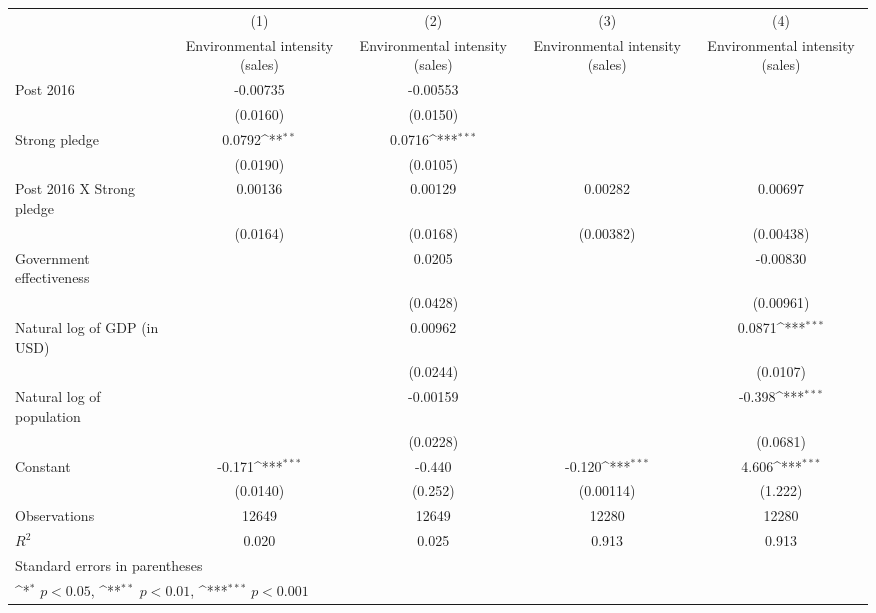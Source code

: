 {
\def\sym#1{\ifmmode^{#1}\else\(^{#1}\)\fi}
\begin{tabular}{l*{4}{c}}
\hline\hline
                    &\multicolumn{1}{c}{(1)}&\multicolumn{1}{c}{(2)}&\multicolumn{1}{c}{(3)}&\multicolumn{1}{c}{(4)}\\
                    &\multicolumn{1}{c}{Environmental intensity (sales)}&\multicolumn{1}{c}{Environmental intensity (sales)}&\multicolumn{1}{c}{Environmental intensity (sales)}&\multicolumn{1}{c}{Environmental intensity (sales)}\\
\hline
Post 2016           &    -0.00735         &    -0.00553         &                     &                     \\
                    &    (0.0160)         &    (0.0150)         &                     &                     \\
[1em]
Strong pledge       &      0.0792\sym{**} &      0.0716\sym{***}&                     &                     \\
                    &    (0.0190)         &    (0.0105)         &                     &                     \\
[1em]
Post 2016 X Strong pledge&     0.00136         &     0.00129         &     0.00282         &     0.00697         \\
                    &    (0.0164)         &    (0.0168)         &   (0.00382)         &   (0.00438)         \\
[1em]
Government effectiveness&                     &      0.0205         &                     &    -0.00830         \\
                    &                     &    (0.0428)         &                     &   (0.00961)         \\
[1em]
Natural log of GDP (in USD)&                     &     0.00962         &                     &      0.0871\sym{***}\\
                    &                     &    (0.0244)         &                     &    (0.0107)         \\
[1em]
Natural log of population&                     &    -0.00159         &                     &      -0.398\sym{***}\\
                    &                     &    (0.0228)         &                     &    (0.0681)         \\
[1em]
Constant            &      -0.171\sym{***}&      -0.440         &      -0.120\sym{***}&       4.606\sym{***}\\
                    &    (0.0140)         &     (0.252)         &   (0.00114)         &     (1.222)         \\
\hline
Observations        &       12649         &       12649         &       12280         &       12280         \\
\(R^{2}\)           &       0.020         &       0.025         &       0.913         &       0.913         \\
\hline\hline
\multicolumn{5}{l}{\footnotesize Standard errors in parentheses}\\
\multicolumn{5}{l}{\footnotesize \sym{*} \(p<0.05\), \sym{**} \(p<0.01\), \sym{***} \(p<0.001\)}\\
\end{tabular}
}
